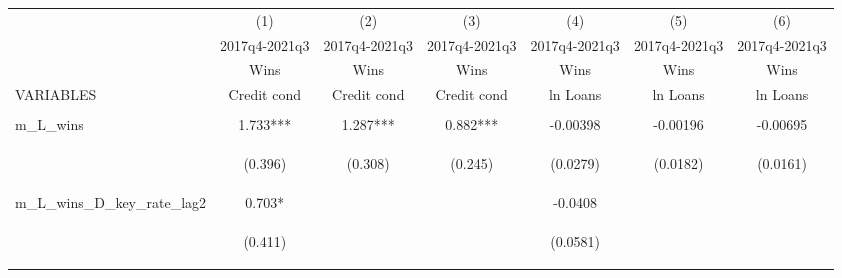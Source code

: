 \documentclass[]{article}
\begin{document}
\begin{center}
\begin{tabular}{lcccccc} \hline
 & (1) & (2) & (3) & (4) & (5) & (6) \\
 & 2017q4-2021q3 & 2017q4-2021q3 & 2017q4-2021q3 & 2017q4-2021q3 & 2017q4-2021q3 & 2017q4-2021q3 \\
 & Wins & Wins & Wins & Wins & Wins & Wins \\
VARIABLES & Credit cond & Credit cond & Credit cond & ln Loans & ln Loans & ln Loans \\ \hline
\vspace{4pt} & \begin{footnotesize}\end{footnotesize} & \begin{footnotesize}\end{footnotesize} & \begin{footnotesize}\end{footnotesize} & \begin{footnotesize}\end{footnotesize} & \begin{footnotesize}\end{footnotesize} & \begin{footnotesize}\end{footnotesize} \\
m\_L\_wins & 1.733*** & 1.287*** & 0.882*** & -0.00398 & -0.00196 & -0.00695 \\
\vspace{4pt} & \begin{footnotesize}(0.396)\end{footnotesize} & \begin{footnotesize}(0.308)\end{footnotesize} & \begin{footnotesize}(0.245)\end{footnotesize} & \begin{footnotesize}(0.0279)\end{footnotesize} & \begin{footnotesize}(0.0182)\end{footnotesize} & \begin{footnotesize}(0.0161)\end{footnotesize} \\
m\_L\_wins\_D\_key\_rate\_lag2 & 0.703* &  &  & -0.0408 &  &  \\
\vspace{4pt} & \begin{footnotesize}(0.411)\end{footnotesize} & \begin{footnotesize}\end{footnotesize} & \begin{footnotesize}\end{footnotesize} & \begin{footnotesize}(0.0581)\end{footnotesize} & \begin{footnotesize}\end{footnotesize} & \begin{footnotesize}\end{footnotesize} \\

\end{tabular}
\end{center}
\end{document}
